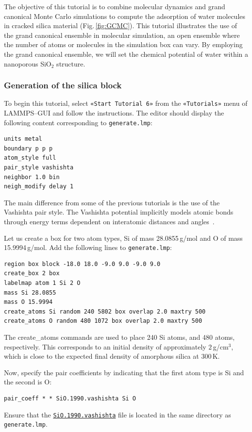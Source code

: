 \documentclass[9pt,tutorial]{livecoms}
\newcommand{\lmpcmd}[1]{\hspace{0pt}\colorbox{listing}{\textcolor{command}{\small{#1}}}\hspace{0pt}} %
\newcommand{\flecmd}[1]{\textcolor{command}{\texttt{#1}}} %
\newcommand{\guicmd}[1]{\textcolor{command}{\texttt{«#1»}}} %
\newcommand{\dwlcmd}[1]{\textcolor{download}{\texttt{#1}}} %
\newcommand{\filepath}{https://raw.githubusercontent.com/lammpstutorials/lammpstutorials-article/main/files/}
\begin{document}
\noindent The objective of this tutorial is to combine molecular dynamics and
grand canonical Monte Carlo simulations to compute the adsorption of water
molecules in cracked silica material (Fig.\,\ref{fig:GCMC}).  This tutorial
illustrates the use of the grand canonical ensemble in molecular simulation, an
open ensemble where the number of atoms or molecules in the simulation box can vary.
By employing the grand canonical ensemble, we will set the chemical
potential of water within a nanoporous SiO$_2$ structure.

\subsubsection{Generation of the silica block}

\noindent To begin this tutorial, select \guicmd{Start Tutorial 6} from the
\guicmd{Tutorials} menu of LAMMPS--GUI and follow the instructions.
The editor should display the following content corresponding to \flecmd{generate.lmp}:
\begin{lstlisting}
units metal
boundary p p p
atom_style full
pair_style vashishta
neighbor 1.0 bin
neigh_modify delay 1
\end{lstlisting}
The main difference from some of the previous tutorials is the use of the \lmpcmd{Vashishta}
pair style.  The Vashishta potential implicitly models atomic bonds through
energy terms dependent on interatomic distances and angles~\cite{vashishta1990interaction}.

Let us create a box for two atom types, \lmpcmd{Si}
of mass 28.0855\,g/mol and \lmpcmd{O} of mass 15.9994\,g/mol.
Add the following lines to \flecmd{generate.lmp}:
\begin{lstlisting}
region box block -18.0 18.0 -9.0 9.0 -9.0 9.0
create_box 2 box
labelmap atom 1 Si 2 O
mass Si 28.0855
mass O 15.9994
create_atoms Si random 240 5802 box overlap 2.0 maxtry 500
create_atoms O random 480 1072 box overlap 2.0 maxtry 500
\end{lstlisting}
The \lmpcmd{create\_atoms} commands are used to place
240 Si atoms, and 480 atoms, respectively.  This corresponds to
an initial density of approximately $2$\,g/cm$^3$, which is close
to the expected final density of amorphous silica at 300\,K.

Now, specify the pair coefficients by indicating that the first atom type
is \lmpcmd{Si} and the second is \lmpcmd{O}:
\begin{lstlisting}
pair_coeff * * SiO.1990.vashishta Si O
\end{lstlisting}
Ensure that the \href{\filepath tutorial6/SiO.1990.vashishta}{\dwlcmd{SiO.1990.vashishta}}
file is located in the same directory as \flecmd{generate.lmp}.
\end{document}
